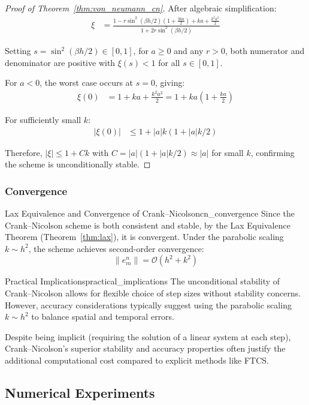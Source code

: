 \begin{proof}[Proof of Theorem~\ref{thm:von_neumann_cn}]
  After algebraic simplification:
  \begin{align*}
    \xi &= \frac{1 - r\sin^2(\beta h/2)(1 + \frac{3ka}{2}) + ka + \frac{k^2a^2}{2}}{1 + 2r\sin^2(\beta h/2)}
  \end{align*}
  
  Setting $s = \sin^2(\beta h/2) \in [0,1]$, for $a \geq 0$ and any $r > 0$, both numerator and denominator are positive with $\xi(s) < 1$ for all $s \in [0,1]$.
  
  \medskip

  For $a < 0$, the worst case occurs at $s = 0$, giving:
  \begin{align*}
    \xi(0) &= 1 + ka + \frac{k^2a^2}{2} = 1 + ka\left(1 + \frac{ka}{2}\right)
  \end{align*}
  
  For sufficiently small $k$:
  \begin{align*}
    |\xi(0)| &\leq 1 + |a|k(1 + |a|k/2)
  \end{align*}
  
  Therefore, $|\xi| \leq 1 + Ck$ with $C = |a|(1 + |a|k/2) \approx |a|$ for small $k$, confirming the scheme is unconditionally stable.
\end{proof}

\subsubsection{Convergence}
\begin{theorem}{Lax Equivalence and Convergence of Crank--Nicolson}{cn_convergence}
  Since the Crank--Nicolson scheme is both consistent and stable, by the Lax Equivalence Theorem (Theorem~\ref{thm:lax}), it is convergent. Under the parabolic scaling $k \sim h^2$, the scheme achieves second-order convergence:
  \[
    \|e_m^n\| = \mathcal{O}\!\left(h^2 + k^2\right)
  \]
\end{theorem}

\begin{remark}{Practical Implications}{practical_implications}
  The unconditional stability of Crank--Nicolson allows for flexible choice of step sizes without stability concerns. However, accuracy considerations typically suggest using the parabolic scaling $k \sim h^2$ to balance spatial and temporal errors.
  
  Despite being implicit (requiring the solution of a linear system at each step), Crank--Nicolson's superior stability and accuracy properties often justify the additional computational cost compared to explicit methods like FTCS.
\end{remark}

\subsection{Numerical Experiments}
